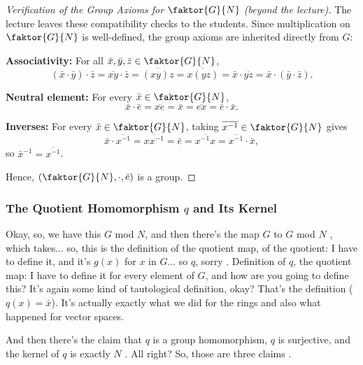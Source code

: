 \begin{proofWrapper}
\begin{content}
\begin{proof}[Verification of the Group Axioms for \texorpdfstring{$\faktor{G}{N}$}{G/N} (beyond the lecture)]
The lecture leaves these compatibility checks to the students. Since multiplication on $\faktor{G}{N}$ is well-defined, the group axioms are inherited directly from $G$:

\textbf{Associativity:} For all $\bar{x}, \bar{y}, \bar{z} \in \faktor{G}{N}$,
\[
(\bar{x} \cdot \bar{y}) \cdot \bar{z} = \overline{xy} \cdot \bar{z} = \overline{(xy)z} = \overline{x(yz)} = \bar{x} \cdot \overline{yz} = \bar{x} \cdot (\bar{y} \cdot \bar{z}).
\]

\textbf{Neutral element:} For every $\bar{x} \in \faktor{G}{N}$,
\[
\bar{x} \cdot \bar{e} = \overline{xe} = \bar{x} = \overline{ex} = \bar{e} \cdot \bar{x}.
\]

\textbf{Inverses:} For every $\bar{x} \in \faktor{G}{N}$, taking $\overline{x^{-1}} \in \faktor{G}{N}$ gives
\[
\bar{x} \cdot \overline{x^{-1}} = \overline{x x^{-1}} = \bar{e} = \overline{x^{-1} x} = \overline{x^{-1}} \cdot \bar{x},
\]
so $\bar{x}^{-1} = \overline{x^{-1}}$.

Hence, $(\faktor{G}{N}, \cdot, \bar{e})$ is a group.
\end{proof}
\end{content}

\subsubsection{The Quotient Homomorphism \texorpdfstring{$q$}{q} and Its Kernel}

\begin{speech}[01:06:27 - 01:07:52]
Okay, so, we have this $G$ mod $N$, and then there's the map $G$ to $G$ mod $N$ , which takes... so, this is the definition of the quotient map, of the quotient: I have to define it, and it's $g(x)$ for $x$ in $G$... so $q$, sorry . Definition of $q$, the quotient map: I have to define it for every element of $G$, and how are you going to define this? It's again some kind of tautological definition, okay? That's the definition ($q(x) = \bar{x}$). It's actually exactly what we did for the rings and also what happened for vector spaces.

And then there's the claim that $q$ is a group homomorphism, $q$ is surjective, and the kernel of $q$ is exactly $N$ . All right? So, those are three claims .
\end{speech}


\end{proofWrapper}
